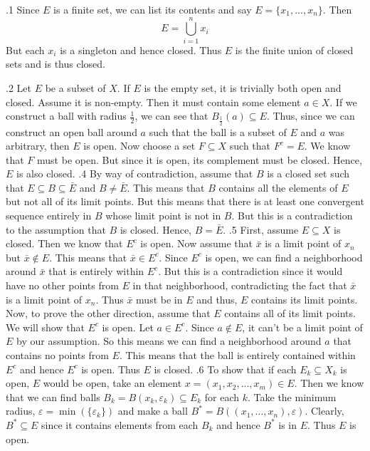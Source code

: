 \documentclass[12pt]{exam}
\begin{document}
\begin{questions}
.1 \newline
Since $E$ is a finite set, we can list its contents and say $E = \{x_1, ..., x_n\}$. Then \[E = \bigcup_{i=1}^n {x_i}\]
But each ${x_i}$ is a singleton and hence closed. Thus $E$ is the finite union of closed sets and is thus closed.

.2 \newline
Let $E$ be a subset of $X$. If $E$ is the empty set, it is trivially both open and closed. Assume it is non-empty. Then it must contain some element $a \in X$. If we construct a ball with radius $\frac{1}{2}$, we can see that $B_{\frac{1}{2}}(a) \subseteq E$. Thus, since we can construct an open ball around $a$ such that the ball is a subset of $E$ and $a$ was arbitrary, then $E$ is open. Now choose a set $F \subseteq X$ such that $F^c = E$. We know that $F$ must be open. But since it is open, its complement must be closed. Hence, $E$ is also closed.
.4\newline
By way of contradiction, assume that $B$ is a closed set such that $E \subseteq B \subseteq \bar{E}$ and $B \neq \bar{E}$. This means that $B$ contains all the elements of $E$ but not all of its limit points. But this means that there is at least one convergent sequence entirely in $B$ whose limit point is not in $B$. But this is a contradiction to the assumption that $B$ is closed. Hence, $B = \bar{E}$. 
.5\newline
First, assume $E \subseteq X$ is closed. Then we know that $E^c$ is open. Now assume that $\bar{x}$ is a limit point of $x_n$ but $\bar{x} \not\in E$. This means that $\bar{x} \in E^c$. Since $E^c$ is open, we can find a neighborhood around $\bar{x}$ that is entirely within $E^c$. But this is a contradiction since it would have no other points from $E$ in that neighborhood, contradicting the fact that $\bar{x}$ is a limit point of $x_n$. Thus $\bar{x}$ must be in $E$ and thus, $E$ contains its limit points. Now, to prove the other direction, assume that $E$ contains all of its limit points. We will show that $E^c$ is open. Let $a\in E^c$. Since $a \not\in E$, it can't be a limit point of $E$ by our assumption. So this means we can find a neighborhood around $a$ that contains no points from $E$. This means that the ball is entirely contained within $E^c$ and hence $E^c$ is open. Thus $E$ is closed. 
.6 \newline
To show that if each $E_k \subseteq X_k$ is open, $E$ would be open, take an element $x = (x_1, x_2, ..., x_m) \in E$. Then we know that we can find balls $B_k = B(x_k, \varepsilon_k) \subseteq E_k$ for each $k$. Take the minimum radius, $\varepsilon = \min(\{\varepsilon_k\})$ and make a ball $B^* = B((x_1, ..., x_n), \varepsilon)$. Clearly,  $B^* \subseteq E$ since it contains elements from each $B_k$ and hence $B^*$ is in $E$. Thus $E$ is open. \newline

\end{questions}
\end{document}
